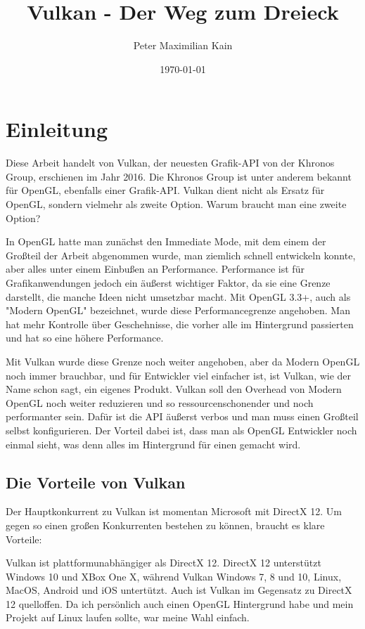 \documentclass[11pt,a4paper]{report}
\title{Vulkan - Der Weg zum Dreieck}
\author{Peter Maximilian Kain}
\date{\today}
\begin{document}
\setlength{\parindent}{0em}
\setlength{\parskip}{1em}
\maketitle
\newpage

\tableofcontents
\newpage

\chapter{Einleitung}
Diese Arbeit handelt von Vulkan, der neuesten Grafik-API von der Khronos Group, erschienen im Jahr 2016. Die Khronos Group ist unter anderem bekannt für OpenGL, ebenfalls einer Grafik-API. Vulkan dient nicht als Ersatz für OpenGL, sondern vielmehr als zweite Option. Warum braucht man eine zweite Option?

In OpenGL hatte man zunächst den Immediate Mode, mit dem einem der Großteil der Arbeit abgenommen wurde, man ziemlich schnell entwickeln konnte, aber alles unter einem Einbußen an Performance. Performance ist für Grafikanwendungen jedoch ein äußerst wichtiger Faktor, da sie eine Grenze darstellt, die manche Ideen nicht umsetzbar macht. Mit OpenGL 3.3+, auch als "Modern OpenGL" bezeichnet, wurde diese Performancegrenze angehoben. Man hat mehr Kontrolle über Geschehnisse, die vorher alle im Hintergrund passierten und hat so eine höhere Performance.

Mit Vulkan wurde diese Grenze noch weiter angehoben, aber da Modern OpenGL noch immer brauchbar, und für Entwickler viel einfacher ist, ist Vulkan, wie der Name schon sagt, ein eigenes Produkt. Vulkan soll den Overhead von Modern OpenGL noch weiter reduzieren und so ressourcenschonender und noch performanter sein. Dafür ist die API äußerst verbos und man muss einen Großteil selbst konfigurieren. Der Vorteil dabei ist, dass man als OpenGL Entwickler noch einmal sieht, was denn alles im Hintergrund für einen gemacht wird.
\newpage

\section{Die Vorteile von Vulkan}
Der Hauptkonkurrent zu Vulkan ist momentan Microsoft mit DirectX 12. Um gegen so einen großen Konkurrenten bestehen zu können, braucht es klare Vorteile:

Vulkan ist plattformunabhängiger als DirectX 12. DirectX 12 unterstützt Windows 10 und XBox One X, während Vulkan Windows 7, 8 und 10, Linux, MacOS, Android und iOS untertützt. Auch ist Vulkan im Gegensatz zu DirectX 12 quelloffen. Da ich persönlich auch einen OpenGL Hintergrund habe und mein Projekt auf Linux laufen sollte, war meine Wahl einfach.
\end{document}
